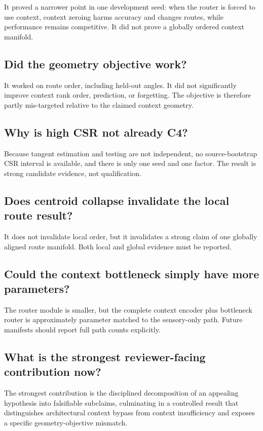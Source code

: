 \documentclass[11pt,a4paper]{article}
\begin{document}
It proved a narrower point in one development seed: when the router is forced to use context, context zeroing harms accuracy and changes routes, while performance remains competitive. It did not prove a globally ordered context manifold.

\subsection*{Did the geometry objective work?}

It worked on route order, including held-out angles. It did not significantly improve context rank order, prediction, or forgetting. The objective is therefore partly mis-targeted relative to the claimed context geometry.

\subsection*{Why is high CSR not already C4?}

Because tangent estimation and testing are not independent, no source-bootstrap CSR interval is available, and there is only one seed and one factor. The result is strong candidate evidence, not qualification.

\subsection*{Does centroid collapse invalidate the local route result?}

It does not invalidate local order, but it invalidates a strong claim of one globally aligned route manifold. Both local and global evidence must be reported.

\subsection*{Could the context bottleneck simply have more parameters?}

The router module is smaller, but the complete context encoder plus bottleneck router is approximately parameter matched to the sensory-only path. Future manifests should report full path counts explicitly.

\subsection*{What is the strongest reviewer-facing contribution now?}

The strongest contribution is the disciplined decomposition of an appealing hypothesis into falsifiable subclaims, culminating in a controlled result that distinguishes architectural context bypass from context insufficiency and exposes a specific geometry-objective mismatch.
\end{document}

